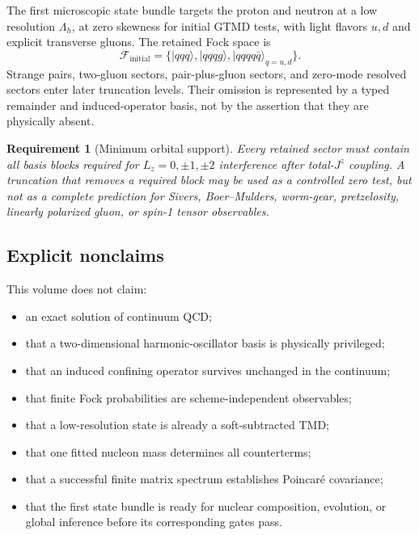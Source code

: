 \documentclass[11pt]{article}
\newtheorem{requirement}[definition]{Requirement}
\newcommand{\cF}{\mathcal F}
\newcommand{\Lz}{L_z}
\newcommand{\Jz}{J^z}
\begin{document}
The first microscopic state bundle targets the proton and neutron at a low
resolution \(\Lambda_h\), at zero skewness for initial GTMD tests, with light
flavors \(u,d\) and explicit transverse gluons.  The retained Fock space is
\begin{equation}
 \cF_{\mathrm{initial}}
 =\bigl\{
 |qqq\rangle,
 |qqqg\rangle,
 |qqqq\bar q\rangle_{q=u,d}
 \bigr\}.
 \label{eq:initial-fock-space}
\end{equation}
Strange pairs, two-gluon sectors, pair-plus-gluon sectors, and zero-mode
resolved sectors enter later truncation levels.  Their omission is represented
by a typed remainder and induced-operator basis, not by the assertion that they
are physically absent.

\begin{requirement}[Minimum orbital support]
Every retained sector must contain all basis blocks required for
\(\Lz=0,\pm1,\pm2\) interference after total-\(\Jz\) coupling.  A truncation
that removes a required block may be used as a controlled zero test, but not as
a complete prediction for Sivers, Boer--Mulders, worm-gear, pretzelosity,
linearly polarized gluon, or spin-1 tensor observables.
\label{req:minimum-oam}
\end{requirement}

\subsection{Explicit nonclaims}

This volume does not claim:
\begin{itemize}
 \item an exact solution of continuum QCD;
 \item that a two-dimensional harmonic-oscillator basis is physically
 privileged;
 \item that an induced confining operator survives unchanged in the continuum;
 \item that finite Fock probabilities are scheme-independent observables;
 \item that a low-resolution state is already a soft-subtracted TMD;
 \item that one fitted nucleon mass determines all counterterms;
 \item that a successful finite matrix spectrum establishes Poincar\'e
 covariance;
 \item that the first state bundle is ready for nuclear composition, evolution,
 or global inference before its corresponding gates pass.
\end{itemize}
\end{document}
